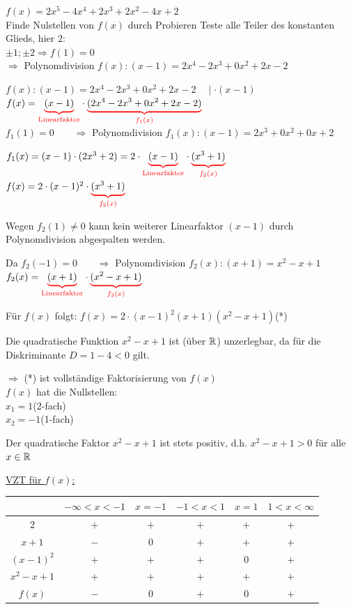 \Bsp $f(x) = 2x^5-4x^4+2x^3+2x^2-4x+2$\\
Finde Nulstellen von $f(x)$ durch {\flqq Probieren\frqq} Teste alle Teiler des {\flqq konstanten Glieds\frqq}, hier $2$:\\
$\pm1;\pm2\Rightarrow f(1) = 0$\\
$\Rightarrow$ Polynomdivision $f(x):(x-1) = 2x^4-2x^3+0x^2+2x-2$

$f(x):(x-1) = 2x^4-2x^3+0x^2+2x-2\quad\mid\cdot(x-1)$\\
$f(x) = \textcolor{red}{\underbrace{\textcolor{black}{(x-1)}}_\text{Linearfaktor}}\cdot\textcolor{red}{\underbrace{\textcolor{black}{(2x^4-2x^3+0x^2+2x-2)}}_{f_1(x)}}$\\
$f_1(1) = 0\qquad\Rightarrow$ Polynomdivision $f_1(x):(x-1) = 2x^3+0x^2+0x+2$

$f_1(x) = (x-1)\cdot(2x^3+2) = 2\cdot \textcolor{red}{\underbrace{\textcolor{black}{(x-1)}}_\text{Linearfaktor}}\cdot\textcolor{red}{\underbrace{\textcolor{black}{(x^3+1)}}_{f_2(x)}}$\\
$f(x) = 2\cdot(x-1)^2\cdot\textcolor{red}{\underbrace{\textcolor{black}{(x^3+1)}}_{f_2(x)}}$

Wegen $f_2(1)\ne0$ kann kein weiterer Linearfaktor $(x-1)$ durch Polynomdivision abgespalten werden.

Da $f_2(-1)=0\qquad\Rightarrow$ Polynomdivision $f_2(x):(x+1) = x^2-x+1$\\
$f_2(x) = \textcolor{red}{\underbrace{\textcolor{black}{(x+1)}}_\text{Linearfaktor}}\cdot\textcolor{red}{\underbrace{\textcolor{black}{(x^2-x+1)}}_{f_3(x)}}$

Für $f(x)$ folgt: $f(x) = 2\cdot(x-1)^2(x+1)(x^2-x+1)$\qquad(*)

Die quadratische Funktion $x^2-x+1$ ist (über $\mathbb{R}$) unzerlegbar, da für die Diskriminante $D=1-4<0$ gilt.

$\Rightarrow$ (*) ist vollständige Faktorisierung von $f(x)$\\
$f(x)$ hat die Nullstellen:\\
$x_1=1$\quad(2-fach)\\
$x_2=-1$\quad(1-fach)

Der quadratische Faktor $x^2-x+1$ ist stets positiv, d.h. $x^2-x+1>0$ für alle $x\in\mathbb{R}$

\clearpage
\ul{VZT für $f(x)$:}

\begin{tabular}{c|c|c|c|c|c}
	& $-\infty<x<-1$ & $x=-1$ & $-1<x<1$ & $x=1$ & $1<x<\infty$\\
	\hline
	$2$ & $+$ & $+$ & $+$ & $+$ & $+$\\
	$x+1$ & $-$ & $0$ & $+$ & $+$ & $+$\\
	$(x-1)^2$ & $+$ & $+$ & $+$ & $0$ & $+$\\
	$x^2-x+1$ & $+$ & $+$ & $+$ & $+$ & $+$\\
	\hline
	$f(x)$ & $-$ & $0$ & $+$ & $0$ & $+$\\
\end{tabular}

